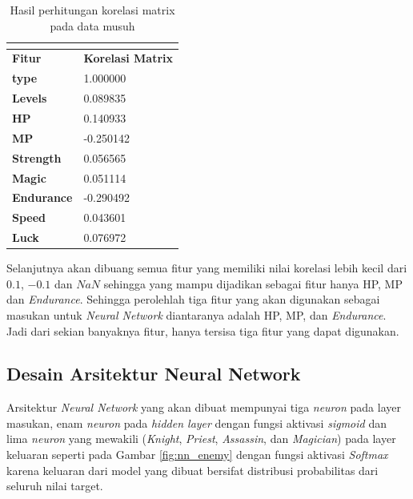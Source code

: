 \begin{longtable}{|l|l|}
	\caption{Hasil perhitungan korelasi matrix pada data musuh}
	\vspace{1ex}
	\label{tb:enemy_matrix_corel}\\
	\hline
	\rowcolor[HTML]{C0C0C0}
	\textbf{Fitur} & \textbf{Korelasi Matrix} \\ \hline
	\textbf{type} & 1.000000 \\ \hline
	\textbf{Levels} & 0.089835 \\ \hline
	\textbf{HP} & 0.140933 \\ \hline
	\textbf{MP} & -0.250142 \\ \hline
	\textbf{Strength} & 0.056565 \\ \hline
	\textbf{Magic} & 0.051114 \\ \hline
	\textbf{Endurance} & -0.290492 \\ \hline
	\textbf{Speed} & 0.043601 \\ \hline
	\textbf{Luck} & 0.076972 \\ \hline
\end{longtable}
\vspace{1ex}

Selanjutnya akan dibuang semua fitur yang memiliki nilai korelasi lebih kecil dari $0.1$, $-0.1$ dan $NaN$ sehingga yang mampu dijadikan sebagai fitur hanya HP, MP dan \textit{Endurance}. Sehingga perolehlah tiga fitur yang akan digunakan sebagai masukan untuk \textit{Neural Network} diantaranya adalah HP, MP, dan \textit{Endurance}. Jadi dari sekian banyaknya fitur, hanya tersisa tiga fitur yang dapat digunakan.
\vspace{1ex}

\subsection{Desain Arsitektur Neural Network}
\label{sec:sub_sec3_enemy_arch}
\vspace{1ex}

Arsitektur \textit{Neural Network} yang akan dibuat mempunyai tiga \textit{neuron} pada layer masukan, enam \textit{neuron} pada \textit{hidden layer} dengan fungsi aktivasi \textit{sigmoid} dan lima \textit{neuron} yang mewakili (\textit{Knight}, \textit{Priest}, \textit{Assassin}, dan \textit{Magician}) pada layer keluaran seperti pada Gambar \ref{fig:nn_enemy} dengan fungsi aktivasi \textit{Softmax} karena keluaran dari model yang dibuat bersifat distribusi probabilitas dari seluruh nilai target.
\vspace{1ex}


